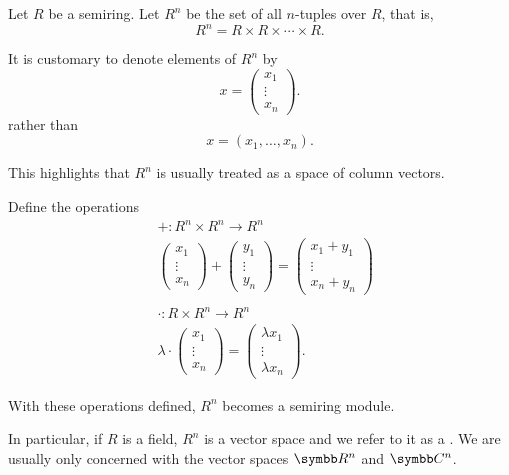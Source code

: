 \begin{definition}\label{def:left_module_of_tuples}
  Let \( R \) be a semiring. Let \( R^n \) be the set of all \( n \)-tuples over \( R \), that is,
  \begin{equation*}
    R^n = R \times R \times \cdots \times R.
  \end{equation*}

  It is customary to denote elements of \( R^n \) by
  \begin{equation*}
    x = \begin{pmatrix} x_1 \\ \vdots \\ x_n \end{pmatrix}.
  \end{equation*}
  rather than
  \begin{equation*}
    x = (x_1, \ldots, x_n).
  \end{equation*}

  This highlights that \( R^n \) is usually treated as a space of column vectors.

  Define the operations
  \begin{align*}
    &+: R^n \times R^n \to R^n
    \\
    &\begin{pmatrix} x_1 \\ \vdots \\ x_n \end{pmatrix}
    +
    \begin{pmatrix} y_1 \\ \vdots \\ y_n \end{pmatrix}
    =
    \begin{pmatrix} x_1 + y_1 \\ \vdots \\ x_n + y_n \end{pmatrix}
    \\
    \\
    &\cdot: R \times R^n \to R^n
    \\
    &\lambda \cdot \begin{pmatrix} x_1 \\ \vdots \\ x_n \end{pmatrix}
    =
    \begin{pmatrix} \lambda x_1 \\ \vdots \\ \lambda x_n \end{pmatrix}.
  \end{align*}

  With these operations defined, \( R^n \) becomes a semiring module.

  In particular, if \( R \) is a field, \( R^n \) is a vector space and we refer to it as a . We are usually only concerned with the vector spaces \( \R^n \) and \( \Co^n \).
\end{definition}

